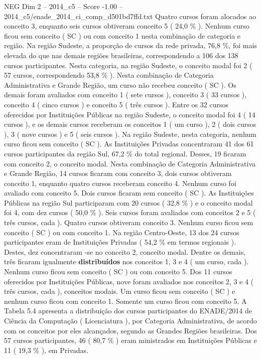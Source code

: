 \begin{textsample}{NEG Dim 2 – 2014\_c5 – Score -1.00 – 2014\_c5/enade\_2014\_ci\_comp\_d501bd7ffd.txt}
Quatro cursos foram alocados ao conceito 3, enquanto seis cursos obtiveram conceito 5 ( 24,0 \% ).
Nenhum curso ficou sem conceito ( SC ) ou com conceito 1 nesta combinação de categoria e região.
Na região Sudeste, a proporção de cursos da rede privada, 76,8 \%, foi mais elevada do que nas demais regiões brasileiras, correspondendo a 106 dos 138 cursos participantes.
Nesta categoria, na região Sudeste, o conceito modal foi 2 ( 57 cursos, correspondendo 53,8 \% ).
Nesta combinação de Categoria Administrativa e Grande Região, um curso não recebeu conceito ( SC ).
Os demais foram avaliados com conceito 1 ( sete cursos ), conceito 3 ( 33 cursos ), conceito 4 ( cinco cursos ) e conceito 5 ( três cursos ).
Entre os 32 cursos oferecidos por Instituições Públicas na região Sudeste, o conceito modal foi 4 ( 14 cursos ), e os demais cursos receberam os conceitos 1 ( um curso ), 2 ( dois cursos ), 3 ( nove cursos ) e 5 ( seis cursos ).
Na região Sudeste, nesta categoria, nenhum curso ficou sem conceito ( SC ).
As Instituições Privadas concentraram 41 dos 61 cursos participantes da região Sul, 67,2 \% do total regional.
Desses, 19 ficaram com conceito 2, o conceito modal.
Nesta combinação de Categoria Administrativa e Grande Região, 14 cursos ficaram com conceito 3, dois cursos obtiveram conceito 1, enquanto quatro cursos receberam conceito 4.
Nenhum curso foi avaliado com conceito 5.
Dois cursos ficaram sem conceito ( SC ).
As Instituições Públicas na região Sul participaram com 20 cursos ( 32,8 \% ) e o conceito modal foi 4, com dez cursos ( 50,0 \% ).
Seis cursos foram avaliados com conceitos 2 e 5 ( três cursos, cada ).
Quatro cursos obtiveram conceito 3.
Nenhum curso ficou sem conceito ( SC ) ou com conceito 1.
Na região Centro-Oeste, 13 dos 24 cursos participantes eram de Instituições Privadas ( 54,2 \% em termos regionais ).
Destes, dez concentraram -se no conceito 2, conceito modal.
Dentre os demais, três ficaram igualmente \textbf{distribuídos} nos conceitos 1, 3 e 4 ( um curso, cada ).
Nenhum curso ficou sem conceito ( SC ) ou com conceito 5.
Dos 11 cursos oferecidos por Instituições Públicas, nove foram avaliados nos conceitos 2, 3 e 4 ( três cursos, cada ), conceitos modais.
Um curso ficou sem conceito ( SC ) e nenhum curso ficou com conceito 1.
Somente um curso ficou com conceito 5.
A Tabela 5.4 apresenta a distribuição dos cursos participantes do ENADE/2014 de Ciência da Computação ( Licenciatura ), por Categoria Administrativa, de acordo com os conceitos por eles alcançados, segundo as Grandes Regiões brasileiras.
Dos 57 cursos participantes, 46 ( 80,7 \% ) eram ministrados em Instituições Públicas e 11 ( 19,3 \% ), em Privadas.

\end{textsample}
